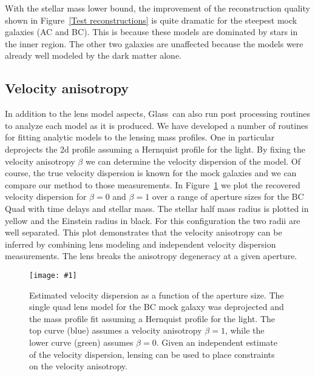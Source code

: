 \documentclass[galley]{mn2e}
\newcommand{\Glass}{{\sc Glass}}
\newcommand{\figref}[1] {Figure~\ref{#1}}
\newcommand\plotone[1]{%
 \centering
 \leavevmode
 \texttt{[image: \#1]}%
}%
\begin{document}
With the stellar mass lower bound, the improvement of the reconstruction
quality shown in \figref{Test reconstructions} is quite dramatic for the
steepest mock galaxies (AC and BC). This is because these models are dominated
by stars in the inner region. The other two galaxies are unaffected because the
models were already well modeled by the dark matter alone.

\subsection{Velocity anisotropy}

In addition to the lens model aspects, \Glass\ can also run post processing
routines to analyze each model as it is produced. We have developed a number of
routines for fitting analytic models to the lensing mass profiles. One in
particular deprojects the 2d profile assuming a Hernquist profile for the
light. By fixing the velocity anisotropy $\beta$ we can determine the velocity
dispersion of the model. Of course, the true velocity dispersion is known for
the mock galaxies and we can compare our method to those measurements.  In
\figref{sigma-beta} we plot the recovered velocity dispersion for $\beta=0$ and $\beta=1$
over a range of aperture sizes for the BC Quad with time delays and stellar
mass. The stellar half mass radius is plotted in yellow and the Einstein radius
in black. For this configuration the two radii are well separated. This plot
demonstrates that the velocity anisotropy can be inferred by combining lens
modeling and independent velocity dispersion measurements. The lens breaks
the anisotropy degeneracy at a given aperture.

\begin{figure}
\plotone{BCQuadR1a_TmS-sb.pdf}
\caption{Estimated velocity dispersion as a function of the aperture size. The
single quad lens model for the BC mock galaxy was deprojected and the mass
profile fit assuming a Hernquist profile for the light. The top curve (blue)
assumes a velocity anisotropy $\beta=1$, while the lower curve (green)
assumes $\beta=0$. Given an independent estimate of the velocity dispersion,
lensing can be used to place constraints on the velocity anisotropy.}
\label{sigma-beta}
\end{figure}

%
\end{document}

